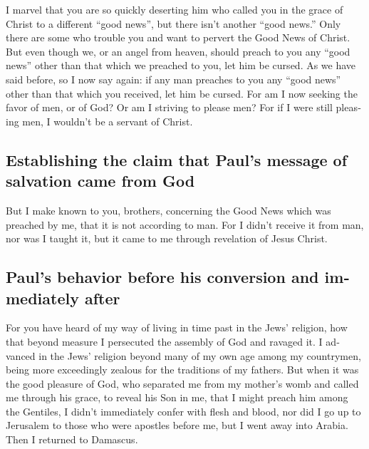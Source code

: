 \begin{paracol}{2}
\begin{otherlanguage}{english}
 I marvel that you are so quickly deserting him who called
you in the grace of Christ to a different ``good news'', 
but there isn't another ``good news.'' Only there are some who trouble
you and want to pervert the Good News of Christ.  But even
though we, or an angel from heaven, should preach to you any ``good
news'' other than that which we preached to you, let him be cursed.
 As we have said before, so I now say again: if any man
preaches to you any ``good news'' other than that which you received,
let him be cursed.  For am I now seeking the favor of
men, or of God? Or am I striving to please men? For if I were still
pleasing men, I wouldn't be a servant of Christ.

\hypertarget{establishing-the-claim-that-pauls-message-of-salvation-came-from-god}{%
\subsection{Establishing the claim that Paul's message of salvation came
from
God}\label{establishing-the-claim-that-pauls-message-of-salvation-came-from-god}}

 But I make known to you, brothers, concerning the Good
News which was preached by me, that it is not according to man.
 For I didn't receive it from man, nor was I taught it,
but it came to me through revelation of Jesus Christ.

\hypertarget{pauls-behavior-before-his-conversion-and-immediately-after}{%
\subsection{Paul's behavior before his conversion and immediately
after}\label{pauls-behavior-before-his-conversion-and-immediately-after}}

 For you have heard of my way of living in time past in
the Jews' religion, how that beyond measure I persecuted the assembly of
God and ravaged it.  I advanced in the Jews' religion
beyond many of my own age among my countrymen, being more exceedingly
zealous for the traditions of my fathers.  But when it
was the good pleasure of God, who separated me from my mother's womb and
called me through his grace,  to reveal his Son in me,
that I might preach him among the Gentiles, I didn't immediately confer
with flesh and blood,  nor did I go up to Jerusalem to
those who were apostles before me, but I went away into Arabia. Then I
returned to Damascus.


\end{otherlanguage}
\end{paracol}
